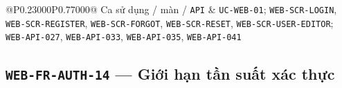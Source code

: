 \begin{longtable}{@{}P{0.23000\SRSWidth}P{0.77000\SRSWidth}@{}}
Ca sử dụng /\allowbreak{} màn /\allowbreak{} \texttt{API} & \texttt{UC-\allowbreak{}WEB-\allowbreak{}01}; \texttt{WEB-\allowbreak{}SCR-\allowbreak{}LOGIN}, \texttt{WEB-\allowbreak{}SCR-\allowbreak{}REGISTER\allowbreak{}}, \texttt{WEB-\allowbreak{}SCR-\allowbreak{}FORGOT}, \texttt{WEB-\allowbreak{}SCR-\allowbreak{}RESET}, \texttt{WEB-\allowbreak{}SCR-\allowbreak{}USER-\allowbreak{}EDITOR}; \texttt{WEB-\allowbreak{}API-\allowbreak{}027}, \texttt{WEB-\allowbreak{}API-\allowbreak{}033}, \texttt{WEB-\allowbreak{}API-\allowbreak{}035}, \texttt{WEB-\allowbreak{}API-\allowbreak{}041} \\[3pt]
\end{longtable}
\endgroup

\subsection{\texttt{WEB-\allowbreak{}FR-\allowbreak{}AUTH-\allowbreak{}14} — Giới hạn tần suất xác thực}
\begingroup
\fontsize{9.5}{12}\selectfont
\setlength{\SRSWidth}{\dimexpr\linewidth-2\tabcolsep\relax}
